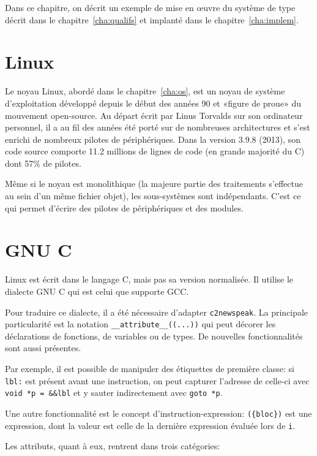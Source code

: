 Dans ce chapitre, on décrit un exemple de mise en œuvre du système de type
décrit dans le chapitre~\ref{cha:qualifs} et implanté dans le
chapitre~\ref{cha:implem}.


\section{Linux}

Le noyau Linux, abordé dans le chapitre~\ref{cha:os}, est un noyau de système
d'exploitation développé depuis le début des années 90 et «figure de proue» du
mouvement open-source. Au départ écrit par Linus Torvalds sur son ordinateur
personnel, il a au fil des années été porté sur de nombreuses architectures et
s'est enrichi de nombreux pilotes de périphériques. Dans la version 3.9.8
(2013), son code source comporte 11.2 millions de lignes de code (en grande
majorité du C) dont 57\% de pilotes.

Même si le noyau est monolithique (la majeure partie des traitements s'effectue
au sein d'un même fichier objet), les sous-systèmes sont indépendants. C'est ce
qui permet d'écrire des pilotes de périphériques et des modules.

\section{GNU C}
\label{sec:gnuc}

Linux est écrit dans le langage C, mais pas sa version normalisée. Il utilise le
dialecte GNU C qui est celui que supporte GCC.\@

Pour traduire ce dialecte, il a été nécessaire d'adapter \texttt{c2newspeak}. La
principale particularité est la notation \verb!__attribute__((...))! qui peut
décorer les déclarations de fonctions, de variables ou de types. De nouvelles
fonctionnalités sont aussi présentes.

Par exemple, il est possible de manipuler des étiquettes de première classe: si
\texttt{lbl:} est présent avant une instruction, on peut capturer l'adresse de
celle-ci avec \texttt{void *p = \&\&lbl} et y sauter indirectement avec
\texttt{goto *p}.

Une autre fonctionnalité est le concept d'instruction-expression:
\texttt{(\{bloc\})} est une expression, dont la valeur est celle de la dernière
expression évaluée lors de \texttt{i}.

Les attributs, quant à eux, rentrent dans trois catégories:

